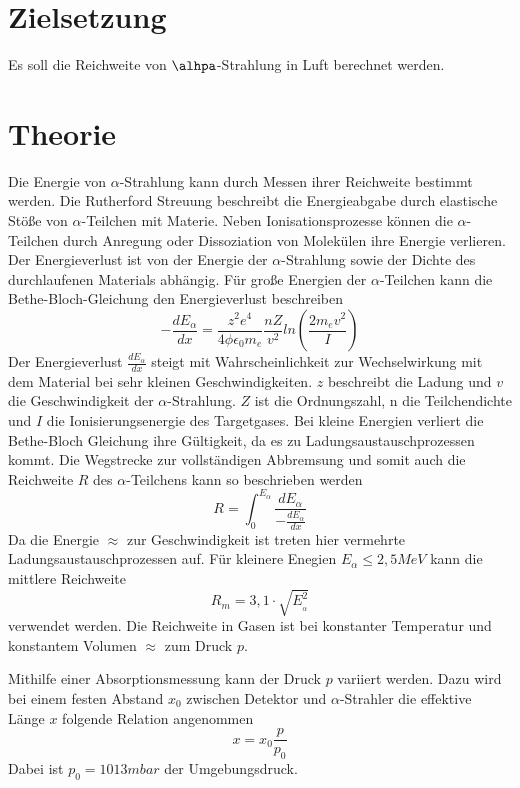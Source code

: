 \section{Zielsetzung}
Es soll die Reichweite von $\alhpa$-Strahlung in Luft berechnet werden.
\section{Theorie}
Die Energie von $\alpha$-Strahlung kann durch Messen ihrer Reichweite bestimmt werden.
Die Rutherford Streuung beschreibt die Energieabgabe durch elastische Stöße von
$\alpha$-Teilchen mit Materie.
Neben Ionisationsprozesse können die $\alpha$-Teilchen durch Anregung oder
Dissoziation von Molekülen ihre Energie verlieren.
Der Energieverlust ist von der Energie der $\alpha$-Strahlung sowie der Dichte
des durchlaufenen Materials abhängig.
Für große Energien der $\alpha$-Teilchen kann die Bethe-Bloch-Gleichung
den Energieverlust beschreiben
\begin{equation}
  -\frac{dE_{\alpha}}{dx} = \frac{z^2 e^4}{4 \phi \epsilon_0 m_e}\frac{nZ}{v^2} ln(\frac{2m_e v^2}{I})
  \label{eq:1}
\end{equation}
Der Energieverlust $\frac{dE_{\alpha}}{dx}$ steigt mit Wahrscheinlichkeit zur Wechselwirkung mit
dem Material bei sehr kleinen Geschwindigkeiten.
$z$ beschreibt die Ladung und $v$ die Geschwindigkeit der $\alpha$-Strahlung.
$Z$ ist die Ordnungszahl, n die Teilchendichte und $I$ die Ionisierungsenergie
des Targetgases. Bei kleine Energien verliert die Bethe-Bloch Gleichung ihre Gültigkeit,
da es zu Ladungsaustauschprozessen kommt.
Die Wegstrecke zur vollständigen Abbremsung
und somit auch die Reichweite $R$ des $\alpha$-Teilchens
kann so beschrieben werden
\begin{equation}
  R = \int_{0}^{E_{\alpha}} \frac{dE_\alpha}{-\frac{dE_{\alpha}}{dx}}
  \label{eq:2}
\end{equation}
Da die Energie $\approx$ zur Geschwindigkeit ist treten hier vermehrte Ladungsaustauschprozessen auf.
Für kleinere Enegien $E_\alpha \leq 2,5 MeV$ kann die mittlere Reichweite
\begin{equation*}
  R_m= 3,1 \cdot \sqrt{E^2__\alpha}
  \label{eq:3}
\end{equation*}
verwendet werden.
Die Reichweite in Gasen ist bei konstanter Temperatur und konstantem Volumen $\approx$ zum Druck $p$.

Mithilfe einer Absorptionsmessung kann der Druck $p$ variiert werden. Dazu
wird bei einem festen Abstand $x_0$ zwischen Detektor und $\alpha$-Strahler die
effektive Länge $x$ folgende Relation angenommen
\begin{equation}
  x = x_0 \frac{p}{p_0}
\end{equation}
Dabei ist $p_0 = 1013 mbar$ der Umgebungsdruck.
